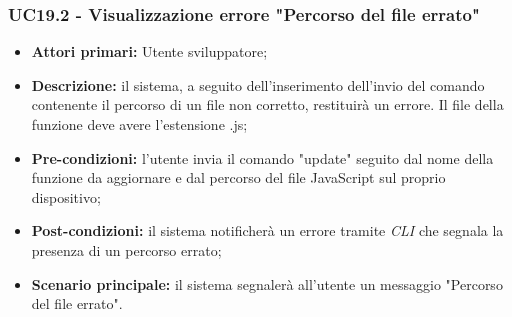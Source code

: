 \subsubsection{UC19.2 - Visualizzazione errore "Percorso del file errato"}
\begin{itemize}
	\item \textbf{Attori primari:} Utente sviluppatore;
	\item \textbf{Descrizione:} il sistema, a seguito dell'inserimento dell'invio del comando contenente il percorso di un file non corretto, restituirà un errore. Il file della funzione deve avere l'estensione .js;
	\item \textbf{Pre-condizioni:}  l'utente invia il comando "update" seguito dal nome della funzione da aggiornare e dal percorso del file JavaScript sul proprio dispositivo;
	\item \textbf{Post-condizioni:} il sistema notificherà un errore tramite \textit{CLI\glo} che segnala la presenza di un percorso errato;
	\item \textbf{Scenario principale:} il sistema segnalerà all'utente un messaggio "Percorso del file errato".
\end{itemize}
